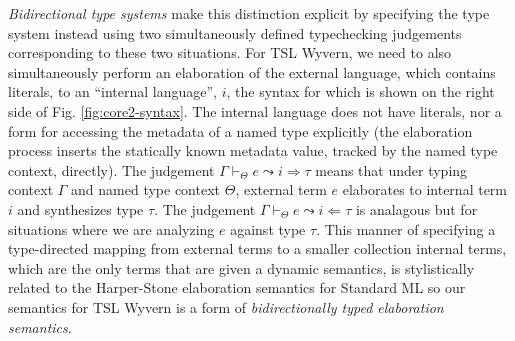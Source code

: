 \emph{Bidirectional type systems} \cite{Pierce:2000:LTI:345099.345100} make this distinction explicit by specifying the type system instead using two simultaneously defined typechecking judgements corresponding to these two situations. %
For TSL Wyvern, we need to also simultaneously perform an elaboration of the external language, which contains literals, to an ``internal language'', $i$, the syntax for which is shown on the right side of Fig. \ref{fig:core2-syntax}. The internal language does not have literals, nor a form for accessing the metadata of a named type explicitly (the elaboration process inserts the statically known metadata value, tracked by the named type context, directly). The judgement $\Gamma \vdash_\Theta e \leadsto i \Rightarrow \tau$ means that under typing context $\Gamma$ and named type context $\Theta$, external term $e$ elaborates to internal term $i$ and synthesizes type $\tau$. The judgement $\Gamma \vdash_\Theta e \leadsto i \Leftarrow \tau$ is analagous but for situations where we are analyzing $e$ against type $\tau$. This manner of specifying a type-directed mapping from external terms to a smaller collection internal terms, which are the only terms that are given a dynamic semantics, is stylistically related to the Harper-Stone elaboration semantics for Standard ML \cite{Harper00atype-theoretic} so  our semantics for TSL Wyvern is a form of \emph{bidirectionally typed elaboration semantics}.%

